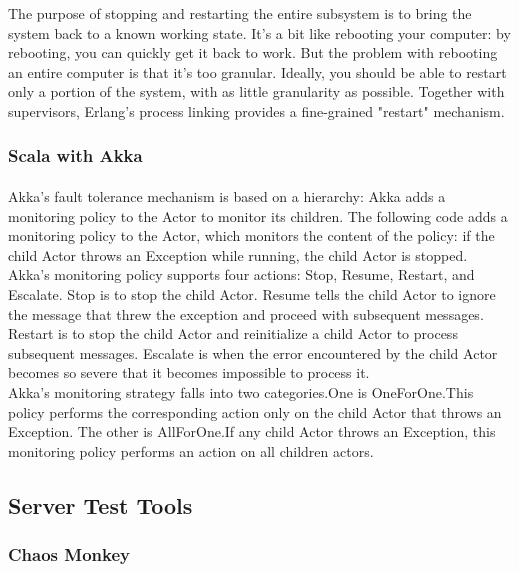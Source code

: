 \documentclass{article}
\begin{document}
The purpose of stopping and restarting the entire subsystem is to bring the system back to a known working state. It's a bit like rebooting your computer: by rebooting, you can quickly get it back to work. But the problem with rebooting an entire computer is that it's too granular. Ideally, you should be able to restart only a portion of the system, with as little granularity as possible. Together with supervisors, Erlang's process linking provides a fine-grained "restart" mechanism.\\

\subsubsection{Scala with Akka}\vspace{16pt}
\paragraph{}\vspace{11pt}\justifying
Akka's fault tolerance mechanism is based on a hierarchy: Akka adds a monitoring policy to the Actor to monitor its children. The following code adds a monitoring policy to the Actor, which monitors the content of the policy: if the child Actor throws an Exception while running, the child Actor is stopped.\\

Akka's monitoring policy supports four actions: Stop, Resume, Restart, and Escalate. Stop is to stop the child Actor. Resume tells the child Actor to ignore the message that threw the exception and proceed with subsequent messages. Restart is to stop the child Actor and reinitialize a child Actor to process subsequent messages. Escalate is when the error encountered by the child Actor becomes so severe that it becomes impossible to process it.\\

Akka's monitoring strategy falls into two categories.One is OneForOne.This policy performs the corresponding action only on the child Actor that throws an Exception. The other is AllForOne.If any child Actor throws an Exception, this monitoring policy performs an action on all children actors.

\subsection{Server Test Tools}\vspace{18pt}
\subsubsection{Chaos Monkey}\vspace{16pt}
\end{document}
